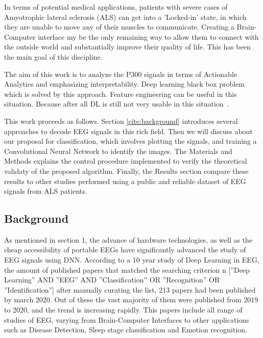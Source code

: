\documentclass[conference]{IEEEtran}
\begin{document}
In terms of potential medical applications, patients with severe cases of Amyotrophic lateral sclerosis (ALS) can get into a 'Locked-in' state, in which they are unable to move any of their muscles to communicate. Creating a Brain-Computer interface my be the only remaining way to allow them to connect with the outside world and substantially improve their quality of life\cite{GUY20185}.  This has been the main goal of this discipline.

The aim of this work is to analyze the P300 signals in terms of Actionable Analytics and emphasizing interpretability.  
Deep learning black box problem which is solved by this approach.  Feature engineering can be useful in this situation. Because after all DL is still not very usable in this situation~\cite{Sterniuk.etal2021}.


This work proceeds as follows.  Section \ref{cite:background} introduces several approaches to decode EEG signals in this rich field.  Then we will discuss about our proposal for classification, which involves plotting the signals, and training a Convolutional Neural Network to identify the images.  The Materials and Methods explains the control procedure implemented to verify the theoretical validaty of the proposed algorithm. Finally, the Results section compare these results to other studies performed using a public and reliable dataset of EEG signals from ALS patients. 

\subsection{Background}
\label{background}


As mentioned in section 1, the advance of hardware technologies, as well as the cheap accessibility of portable EEGs have significantly advanced the study of EEG signals using DNN. According to a 10 year study of Deep Learning in EEG\cite{dnn10years}, the amount of published papers that matched the searching criterion n [”Deep Learning” AND ”EEG” AND ”Classification” OR ”Recognition” OR ”Identification”] after manually curating the list, 213 papers had been published by march 2020. Out of these the vast majority of them were published from 2019 to 2020, and the trend is increasing rapidly. This papers include all range of studies of EEG, varying from Brain-Computer Interfaces to other applications such as Disease Detection, Sleep stage classification and Emotion recognition. 
\end{document}
